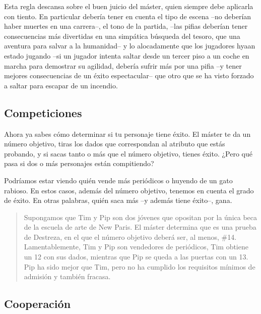 Esta regla descansa sobre el buen juicio del máster, quien siempre debe aplicarla con tiento. En particular debería tener en cuenta el tipo de escena --no deberían haber muertes en una carrera--, el tono de la partida, --las pifias deberían tener consecuencias más divertidas en una simpática búsqueda del tesoro, que una aventura para salvar a la humanidad-- y lo alocadamente que los jugadores hyaan estado jugando --si un jugador intenta saltar desde un tercer piso a un coche en marcha para demostrar su agilidad, debería sufrir más por una pifia --y tener mejores consecuencias de un éxito espectacular-- que otro que se ha visto forzado a saltar para escapar de un incendio.


\subsection{Competiciones}

Ahora ya sabes cómo determinar si tu personaje tiene éxito. El máster te da
un número objetivo, tiras los dados que correspondan al atributo que estás probando,
y si sacas tanto o más que el número objetivo, tienes éxito. ¿Pero qué pasa
si dos o más personajes están compitiendo?

Podríamos estar viendo quién vende más periódicos o huyendo de un gato rabioso.
En estos casos, además del número objetivo, tenemos en cuenta el grado de éxito.
En otras palabras, quién saca más --y además tiene éxito--, gana.

\begin{quotation}
Supongamos que Tim y Pip son dos jóvenes que opositan por la única beca de la
escuela de arte de New Paris. El máster determina que es una prueba de Destreza,
en el que el número objetivo deberá ser, al menos, \#14. Lamentablemente, Tim y
Pip son vendedores de periódicos, Tim obtiene un 12 con sus dados, mientras que 
Pip se queda a las puertas con un 13. Pip ha sido mejor que Tim, pero no ha cumplido
los requisitos mínimos de admisión y también fracasa.
\end{quotation}

\subsection{Cooperación}


